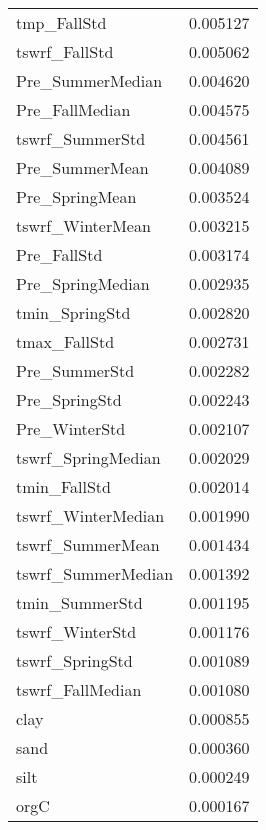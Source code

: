 \begin{tabular}{lr}
tmp_FallStd & 0.005127 \\
tswrf_FallStd & 0.005062 \\
Pre_SummerMedian & 0.004620 \\
Pre_FallMedian & 0.004575 \\
tswrf_SummerStd & 0.004561 \\
Pre_SummerMean & 0.004089 \\
Pre_SpringMean & 0.003524 \\
tswrf_WinterMean & 0.003215 \\
Pre_FallStd & 0.003174 \\
Pre_SpringMedian & 0.002935 \\
tmin_SpringStd & 0.002820 \\
tmax_FallStd & 0.002731 \\
Pre_SummerStd & 0.002282 \\
Pre_SpringStd & 0.002243 \\
Pre_WinterStd & 0.002107 \\
tswrf_SpringMedian & 0.002029 \\
tmin_FallStd & 0.002014 \\
tswrf_WinterMedian & 0.001990 \\
tswrf_SummerMean & 0.001434 \\
tswrf_SummerMedian & 0.001392 \\
tmin_SummerStd & 0.001195 \\
tswrf_WinterStd & 0.001176 \\
tswrf_SpringStd & 0.001089 \\
tswrf_FallMedian & 0.001080 \\
clay & 0.000855 \\
sand & 0.000360 \\
silt & 0.000249 \\
orgC & 0.000167 \\
\bottomrule
\end{tabular}
